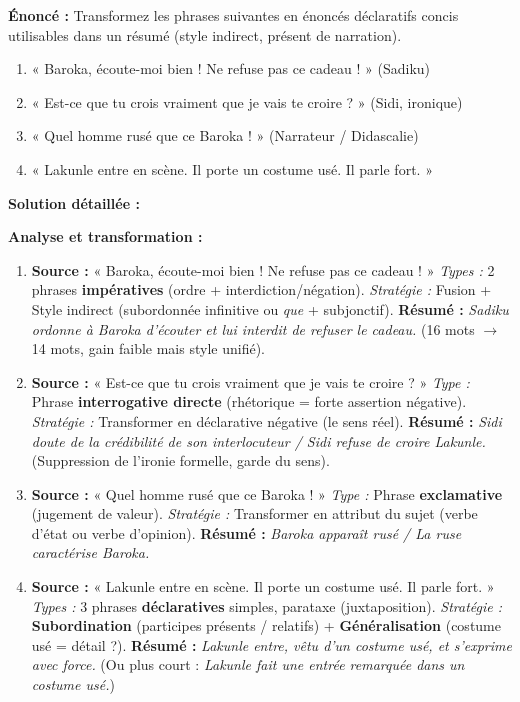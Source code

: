 \documentclass[11pt]{article}
\begin{document}
\begin{exoresolu}
    \textbf{Énoncé :} Transformez les phrases suivantes en énoncés déclaratifs concis utilisables dans un résumé (style indirect, présent de narration).
    \begin{enumerate}
        \item « Baroka, écoute-moi bien ! Ne refuse pas ce cadeau ! » (Sadiku)
        \item « Est-ce que tu crois vraiment que je vais te croire ? » (Sidi, ironique)
        \item « Quel homme rusé que ce Baroka ! » (Narrateur / Didascalie)
        \item « Lakunle entre en scène. Il porte un costume usé. Il parle fort. »
    \end{enumerate}
    \tcblower
    \textbf{Solution détaillée :}
    
    \textbf{Analyse et transformation :}
    
\begin{enumerate}
    \item \textbf{Source :} « Baroka, écoute-moi bien ! Ne refuse pas ce cadeau ! » 
    \textit{Types :} 2 phrases \textbf{impératives} (ordre + interdiction/négation).
    \textit{Stratégie :} Fusion + Style indirect (subordonnée infinitive ou \emph{que} + subjonctif).
    \textbf{Résumé :} \emph{Sadiku ordonne à Baroka d'écouter et lui interdit de refuser le cadeau.} (16 mots $\rightarrow$ 14 mots, gain faible mais style unifié).
    
    \item \textbf{Source :} « Est-ce que tu crois vraiment que je vais te croire ? »
    \textit{Type :} Phrase \textbf{interrogative directe} (rhétorique = forte assertion négative).
    \textit{Stratégie :} Transformer en déclarative négative (le sens réel).
    \textbf{Résumé :} \emph{Sidi doute de la crédibilité de son interlocuteur / Sidi refuse de croire Lakunle.} (Suppression de l'ironie formelle, garde du sens).
    
    \item \textbf{Source :} « Quel homme rusé que ce Baroka ! »
    \textit{Type :} Phrase \textbf{exclamative} (jugement de valeur).
    \textit{Stratégie :} Transformer en attribut du sujet (verbe d'état ou verbe d'opinion).
    \textbf{Résumé :} \emph{Baroka apparaît rusé / La ruse caractérise Baroka.}
    
    \item \textbf{Source :} « Lakunle entre en scène. Il porte un costume usé. Il parle fort. »
    \textit{Types :} 3 phrases \textbf{déclaratives} simples, parataxe (juxtaposition).
    \textit{Stratégie :} \textbf{Subordination} (participes présents / relatifs) + \textbf{Généralisation} (costume usé = détail ?).
    \textbf{Résumé :} \emph{Lakunle entre, vêtu d'un costume usé, et s'exprime avec force.} (Ou plus court : \emph{Lakunle fait une entrée remarquée dans un costume usé.})
    

\end{enumerate}
\end{exoresolu}
\end{document}
